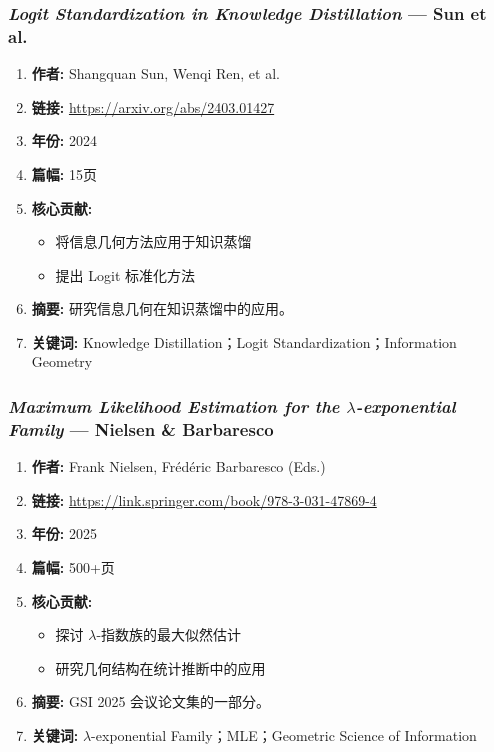\subsubsection{\textbf{\textit{Logit Standardization in Knowledge Distillation}} — Sun et al.}
\begin{enumerate}
    \item \textbf{作者:} Shangquan Sun, Wenqi Ren, et al.
    \item \textbf{链接:} \url{https://arxiv.org/abs/2403.01427}
    \item \textbf{年份:} 2024
    \item \textbf{篇幅:} 15页
    \item \textbf{核心贡献:}
        \begin{itemize}
            \item 将信息几何方法应用于知识蒸馏
            \item 提出 Logit 标准化方法
        \end{itemize}
    \item \textbf{摘要:} 研究信息几何在知识蒸馏中的应用。
    \item \textbf{关键词:} Knowledge Distillation；Logit Standardization；Information Geometry
\end{enumerate}

\subsubsection{\textbf{\textit{Maximum Likelihood Estimation for the $\lambda$-exponential Family}} — Nielsen \& Barbaresco}
\begin{enumerate}
    \item \textbf{作者:} Frank Nielsen, Frédéric Barbaresco (Eds.)
    \item \textbf{链接:} \url{https://link.springer.com/book/978-3-031-47869-4}
    \item \textbf{年份:} 2025
    \item \textbf{篇幅:} 500+页
    \item \textbf{核心贡献:}
        \begin{itemize}
            \item 探讨 $\lambda$-指数族的最大似然估计
            \item 研究几何结构在统计推断中的应用
        \end{itemize}
    \item \textbf{摘要:} GSI 2025 会议论文集的一部分。
    \item \textbf{关键词:} $\lambda$-exponential Family；MLE；Geometric Science of Information
\end{enumerate}

